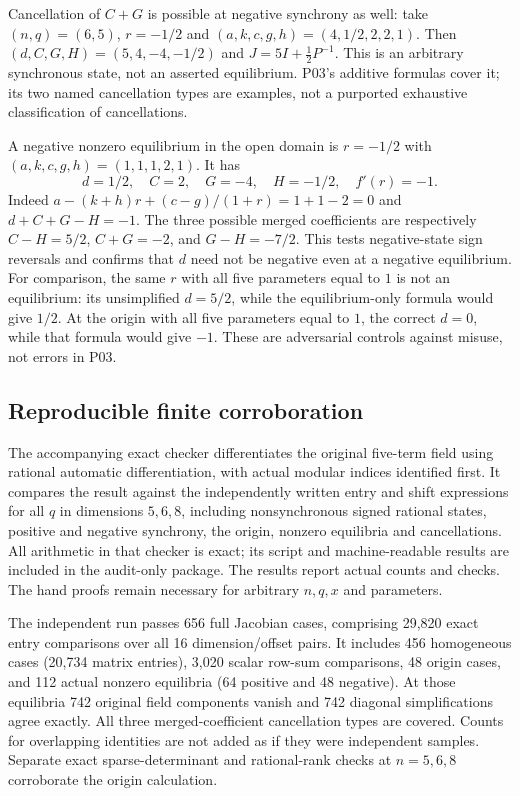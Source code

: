 \documentclass[11pt]{article}
\begin{document}
Cancellation of $C+G$ is possible at negative synchrony as well: take
$(n,q)=(6,5)$, $r=-1/2$ and $(a,k,c,g,h)=(4,1/2,2,2,1)$.
Then $(d,C,G,H)=(5,4,-4,-1/2)$ and $J=5I+\tfrac12P^{-1}$.
This is an arbitrary synchronous state, not an asserted equilibrium.
P03's additive formulas cover it; its two named cancellation types are
examples, not a purported exhaustive classification of cancellations.

A negative nonzero equilibrium in the open domain is $r=-1/2$ with
$(a,k,c,g,h)=(1,1,1,2,1)$. It has
\[
 d=1/2,\quad C=2,\quad G=-4,\quad H=-1/2,\quad f'(r)=-1.
\]
Indeed $a-(k+h)r+(c-g)/(1+r)=1+1-2=0$ and
$d+C+G-H=-1$. The three possible merged coefficients are respectively
$C-H=5/2$, $C+G=-2$, and $G-H=-7/2$. This tests negative-state sign
reversals and confirms that $d$ need not be negative even at a negative
equilibrium. For comparison, the same $r$ with all five parameters equal
to $1$ is not an equilibrium: its unsimplified $d=5/2$, while the
equilibrium-only formula would give $1/2$. At the origin with all five
parameters equal to $1$, the correct $d=0$, while that formula would give
$-1$. These are adversarial controls against misuse, not errors in P03.

\subsection*{Reproducible finite corroboration}
The accompanying exact checker differentiates the original five-term field
using rational automatic differentiation, with actual modular indices
identified first. It compares the result against the independently written
entry and shift expressions for all $q$ in dimensions $5,6,8$, including
nonsynchronous signed rational states, positive and negative synchrony,
the origin, nonzero equilibria and cancellations. All arithmetic in that
checker is exact; its script and machine-readable results are included in
the audit-only package. The results report actual counts and checks.
The hand proofs remain necessary for arbitrary $n,q,x$ and parameters.

The independent run passes 656 full Jacobian cases, comprising 29,820 exact
entry comparisons over all 16 dimension/offset pairs. It includes 456
homogeneous cases (20,734 matrix entries), 3,020 scalar row-sum comparisons,
48 origin cases, and 112 actual nonzero equilibria (64 positive and 48
negative). At those equilibria 742 original field components vanish and
742 diagonal simplifications agree exactly. All three merged-coefficient
cancellation types are covered. Counts for overlapping identities are not
added as if they were independent samples. Separate exact sparse-determinant
and rational-rank checks at $n=5,6,8$ corroborate the origin calculation.
\end{document}
